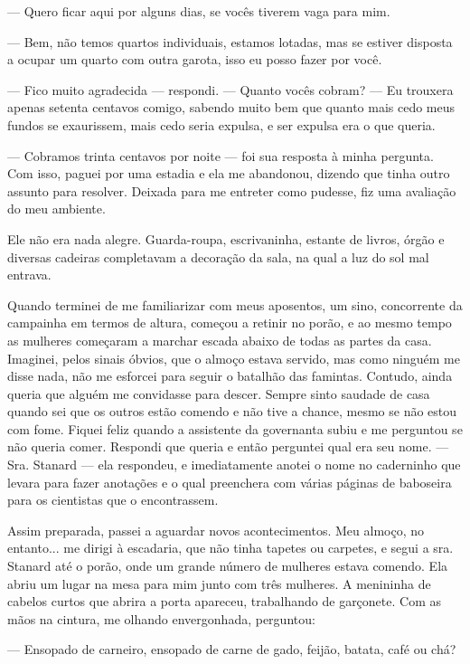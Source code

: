--- Quero ficar aqui por alguns dias, se vocês tiverem vaga para mim.

--- Bem, não temos quartos individuais, estamos lotadas, mas se estiver
disposta a ocupar um quarto com outra garota, isso eu posso fazer por
você.

--- Fico muito agradecida --- respondi. --- Quanto vocês cobram? --- Eu
trouxera apenas setenta centavos comigo, sabendo muito bem que quanto
mais cedo meus fundos se exaurissem, mais cedo seria expulsa, e ser
expulsa era o que queria.

--- Cobramos trinta centavos por noite --- foi sua resposta à minha
pergunta. Com isso, paguei por uma estadia e ela me abandonou, dizendo
que tinha outro assunto para resolver. Deixada para me entreter como
pudesse, fiz uma avaliação do meu ambiente.

Ele não era nada alegre. Guarda-roupa, escrivaninha, estante de livros,
órgão e diversas cadeiras completavam a decoração da sala, na qual a luz
do sol mal entrava.

Quando terminei de me familiarizar com meus aposentos, um sino,
concorrente da campainha em termos de altura, começou a retinir no
porão, e ao mesmo tempo as mulheres começaram a marchar escada abaixo de
todas as partes da casa. Imaginei, pelos sinais óbvios, que o almoço
estava servido, mas como ninguém me disse nada, não me esforcei para
seguir o batalhão das famintas. Contudo, ainda queria que alguém me
convidasse para descer. Sempre sinto saudade de casa quando sei que os
outros estão comendo e não tive a chance, mesmo se não estou com fome.
Fiquei feliz quando a assistente da governanta subiu e me perguntou se
não queria comer. Respondi que queria e então perguntei qual era seu
nome. --- Sra. Stanard --- ela respondeu, e imediatamente anotei o nome no
caderninho que levara para fazer anotações e o qual preenchera com
várias páginas de baboseira para os cientistas que o encontrassem.

Assim preparada, passei a aguardar novos acontecimentos. Meu almoço, no
entanto... me dirigi à escadaria, que não tinha tapetes ou carpetes, e
segui a sra. Stanard até o porão, onde um grande número de mulheres
estava comendo. Ela abriu um lugar na mesa para mim junto com três
mulheres. A menininha de cabelos curtos que abrira a porta apareceu,
trabalhando de garçonete. Com as mãos na cintura, me olhando
envergonhada, perguntou:

--- Ensopado de carneiro, ensopado de carne de gado, feijão, batata,
café ou chá?

